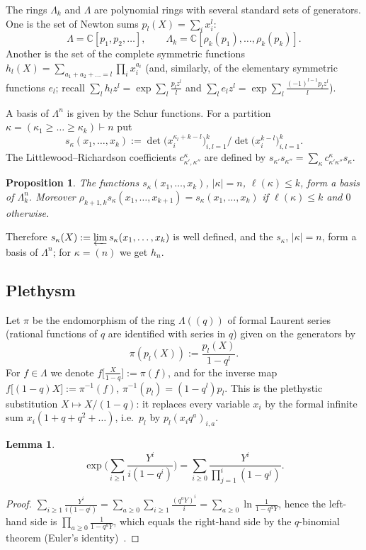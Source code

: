 \documentclass[11pt]{amsart}
\numberwithin{equation}{section}
\newtheorem{proposition}[equation]{Proposition}
\newtheorem{lemma}[equation]{Lemma}
\theoremstyle{definition}
\newcommand{\Lam}{\Lambda}
\begin{document}
	The rings $\Lam_k$ and $\Lam$ are polynomial rings with several standard sets of generators. One is the set of Newton sums $p_l(X)=\sum_ix_i^l$:
	\[
	\Lam=\mathbb{C}[p_1,p_2,\dots],\qquad \Lam_k=\mathbb{C}[\rho_k(p_1),\dots,\rho_k(p_k)].
	\]
	Another is the set of the complete symmetric functions $h_l(X)=\sum_{a_1+a_2+\dots=l}\prod_ix_i^{a_i}$ (and, similarly, of the elementary symmetric functions $e_l$; recall $\sum_lh_lz^l=\exp\sum_l\frac{p_lz^l}{l}$ and $\sum_le_lz^l=\exp\sum_l\frac{(-1)^{l-1}p_lz^l}l$).
	
	A basis of $\Lam^n$ is given by the Schur functions. For a partition $\kappa=(\kappa_1\ge\dots\ge\kappa_k)\vdash n$ put
	\[
	s_\kappa(x_1,\dots,x_k):=\det\big(x_i^{\kappa_l+k-l}\big)_{i,l=1}^k\Big/\det\big(x_i^{k-l}\big)_{i,l=1}^k .
	\]
	The Littlewood--Richardson coefficients $c^\kappa_{\kappa',\kappa''}$ are defined by $s_{\kappa'}s_{\kappa''}=\sum_\kappa c^{\kappa}_{\kappa'\kappa''}s_\kappa$.
	
	\begin{proposition}\label{prop:Schur-basis}
		The functions $s_\kappa(x_1,\dots,x_k)$, $|\kappa|=n$, $\ell(\kappa)\le k$, form a basis of $\Lam_k^n$. Moreover $\rho_{k+1,k}s_\kappa(x_1,\dots,x_{k+1})=s_\kappa(x_1,\dots,x_k)$ if $\ell(\kappa)\le k$ and $0$ otherwise.
	\end{proposition}
	Therefore $s_\kappa(X):=\varprojlim s_\kappa(x_1,\dots,x_k)$ is well defined, and the $s_\kappa$, $|\kappa|=n$, form a basis of $\Lam^n$; for $\kappa=(n)$ we get $h_n$.
	
	\subsection{Plethysm}\label{ssec:plethysm}
	Let $\pi$ be the endomorphism of the ring $\Lam((q))$ of formal Laurent series (rational functions of $q$ are identified with series in $q$) given on the generators by
	\[
	\pi(p_l(X)):=\frac{p_l(X)}{1-q^l}.
	\]
	For $f\in\Lam$ we denote $f\big[\tfrac{X}{1-q}\big]:=\pi(f)$, and for the inverse map $f\big[(1-q)X\big]:=\pi^{-1}(f)$, $\pi^{-1}(p_l)=(1-q^l)p_l$. This is the plethystic substitution $X\mapsto X/(1-q)$: it replaces every variable $x_i$ by the formal infinite sum $x_i(1+q+q^2+\dots)$, i.e.\ $p_l$ by $p_l(x_i q^{a})_{i,a}$.
	
	\begin{lemma}\label{lem:qlog}
		\[
		\exp\Big(\sum_{i\ge1}\frac{Y^i}{i(1-q^i)}\Big)=\sum_{i\ge0}\frac{Y^i}{\prod_{j=1}^i(1-q^j)} .
		\]
	\end{lemma}
	\begin{proof}
		$\sum_{i\ge1}\frac{Y^i}{i(1-q^i)}=\sum_{a\ge0}\sum_{i\ge1}\frac{(q^aY)^i}i=\sum_{a\ge0}\ln\frac1{1-q^aY}$, hence the left-hand side is $\prod_{a\ge0}\frac1{1-q^aY}$, which equals the right-hand side by the $q$-binomial theorem (Euler's identity)~\cite[Theorem~2.1]{A}.
	\end{proof}
	
\end{document}
